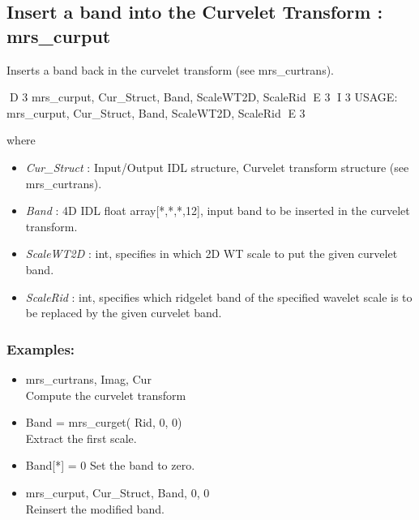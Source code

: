\subsection{Insert a band into the Curvelet Transform : mrs\_curput}
Inserts a band back in the curvelet transform (see mrs\_curtrans).   
{\bf
\begin{center}
D 3
      mrs\_curput, Cur\_Struct, Band, ScaleWT2D, ScaleRid
E 3
I 3
      USAGE: mrs\_curput, Cur\_Struct, Band, ScaleWT2D, ScaleRid
E 3
\end{center}}
where
\begin{itemize}
\item {\em Cur\_Struct} : Input/Output IDL structure, Curvelet transform structure (see mrs\_curtrans).
\item {\em Band} : 4D IDL float array[*,*,*,12], input band to be inserted in the curvelet transform.
\item {\em ScaleWT2D} : int, specifies in which 2D WT scale to put the given curvelet band.
\item {\em ScaleRid} : int, specifies which ridgelet band of the specified wavelet scale is to be replaced by the given curvelet band. 
\end{itemize}

\subsubsection*{Examples:} 
\begin{itemize}
\item mrs\_curtrans, Imag, Cur   \\
Compute the curvelet transform
\item Band = mrs\_curget( Rid, 0, 0) \\
Extract the first scale.
\item Band[*] = 0
Set the band to zero.
\item mrs\_curput, Cur\_Struct, Band, 0, 0 \\
Reinsert the modified band.  
\end{itemize}



